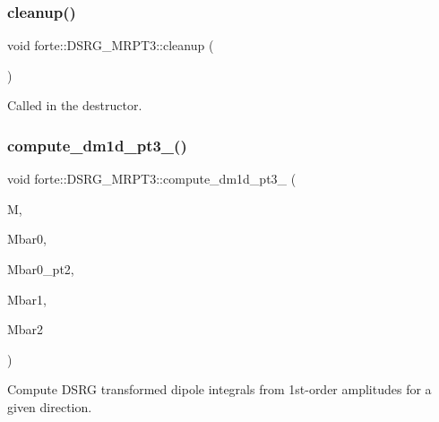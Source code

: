 \subsubsection{\texorpdfstring{cleanup()}{cleanup()}}
{\footnotesize\ttfamily void forte\+::\+D\+S\+R\+G\+\_\+\+M\+R\+P\+T3\+::cleanup (\begin{DoxyParamCaption}{ }\end{DoxyParamCaption})\hspace{0.3cm}{\ttfamily [protected]}}



Called in the destructor. 

\mbox{\label{classforte_1_1_d_s_r_g___m_r_p_t3_ab6ccdab98659f6661900cfa29fa6872d}} 
\subsubsection{\texorpdfstring{compute\+\_\+dm1d\+\_\+pt3\+\_()}{compute\_dm1d\_pt3\_1()}}
{\footnotesize\ttfamily void forte\+::\+D\+S\+R\+G\+\_\+\+M\+R\+P\+T3\+::compute\+\_\+dm1d\+\_\+pt3\+\_ (\begin{DoxyParamCaption}\item[{Blocked\+Tensor \&}]{M,  }\item[{double \&}]{Mbar0,  }\item[{double \&}]{Mbar0\+\_\+pt2,  }\item[{Blocked\+Tensor \&}]{Mbar1,  }\item[{Blocked\+Tensor \&}]{Mbar2 }\end{DoxyParamCaption})\hspace{0.3cm}{\ttfamily [protected]}}



Compute D\+S\+RG transformed dipole integrals from 1st-\/order amplitudes for a given direction. 

